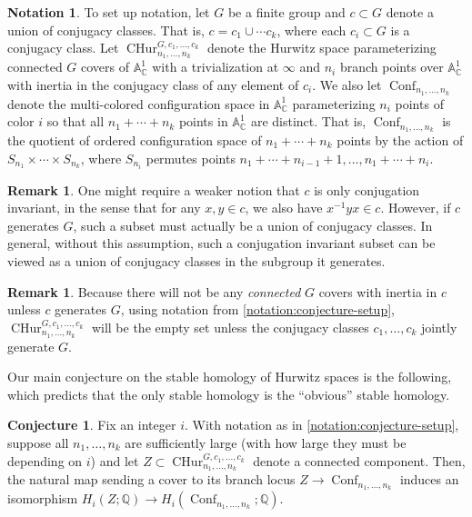 \documentclass[12 pt]{amsart}
\theoremstyle{plain}
\theoremstyle{definition}
\newtheorem{remark}[theorem]{Remark}
\newtheorem{conjecture}[theorem]{Conjecture}
\newtheorem{notation}[theorem]{Notation}
\theoremstyle{remark}
\numberwithin{equation}{section}
\DeclareMathOperator\conf{Conf}
\newcommand{\cphurc}[3]{\operatorname{CHur}^{#1, #3}_{#2}}
\begin{document}
\begin{notation}
	\label{notation:conjecture-setup}
	To set up notation, let $G$ be a finite group and $c \subset G$ denote a union of conjugacy
	classes. That is, $c = c_1 \cup \cdots c_k$, where each $c_i \subset G$ is a conjugacy class.
	Let $\cphurc G {n_1, \ldots, n_k} {c_1,
\ldots, c_k}$ denote the Hurwitz space parameterizing connected $G$ covers of
$\mathbb A^1_{\mathbb C}$ with a trivialization at $\infty$ and $n_i$ branch
points over $\mathbb A^1_{\mathbb C}$ with inertia in the conjugacy class of any element
of $c_i$. 
We also let $\conf_{n_1, \ldots, n_k}$ denote the multi-colored
configuration space in $\mathbb A^1_{\mathbb C}$ parameterizing $n_i$ points of
color $i$ so that all $n_1 + \cdots + n_k$ points in $\mathbb A^1_{\mathbb C}$ are distinct.
That is, 
$\conf_{n_1, \ldots, n_k}$ is the quotient of ordered configuration space of
$n_1 + \cdots + n_k$ points by the action of $S_{n_1} \times \cdots \times
S_{n_k}$, where $S_{n_i}$ permutes points $n_1 + \cdots + n_{i-1} + 1, \ldots,
n_1 + \cdots + n_i$.
\end{notation}
\begin{remark}
\label{remark:union-of-conjugacy-classes}
One might require a weaker notion that $c$ is only conjugation invariant, in the
sense that for any 
$x, y \in c$, we also have $x^{-1}yx \in c$.
However, if $c$ generates $G$, such a subset must
actually be a union of conjugacy classes.
In general, without this assumption,
such a conjugation invariant subset can be viewed as a union of conjugacy
classes in the subgroup it generates.
\end{remark}

\begin{remark}
	\label{remark:}
	Because there will not be any {\em connected} $G$ covers with inertia in $c$
	unless $c$ generates
	$G$, using notation from \autoref{notation:conjecture-setup},
$\cphurc G {n_1, \ldots, n_k} {c_1,
\ldots, c_k} $ will be the empty set unless the conjugacy classes $c_1, \ldots, c_k$
jointly generate $G$.
\end{remark}

Our main conjecture on the stable homology of Hurwitz spaces is the following,
which predicts that the only stable homology is the ``obvious'' stable homology.

\begin{conjecture}
	\label{conjecture:homology}
	Fix an integer $i$. With notation as in
\autoref{notation:conjecture-setup}, suppose
	all $n_1, \ldots, n_k$ are sufficiently large (with how large they must
	be depending on $i$) and let $Z
	\subset \cphurc G {n_1, \ldots, n_k} {c_1,\ldots, c_k} $ denote
	a connected component. Then, the natural map sending a cover to its
	branch locus $Z \to \conf_{n_1, \ldots,
	n_k}$ induces an isomorphism $
H_i(Z; \mathbb Q) \to
	H_i(\conf_{n_1, \ldots,
	n_k}; \mathbb Q).$
\end{conjecture}
\end{document}
